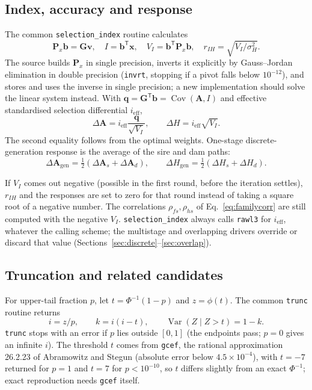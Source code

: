 \documentclass[11pt]{article}
\newcommand{\src}[1]{\texttt{#1}}
\newcommand{\Cov}{\operatorname{Cov}}
\newcommand{\Var}{\operatorname{Var}}
\newcommand{\ve}[1]{\boldsymbol{#1}}
\newcommand{\ma}[1]{\mathbf{#1}}
\begin{document}
\subsection{Index, accuracy and response}
The common \src{selection\_index} routine calculates
\begin{equation}\label{eq:index}
\ma P_x\ve b=\ma G\ve v,\quad
I=\ve b^{\mathsf T}\ve x,\quad V_I=\ve b^{\mathsf T}\ma P_x\ve b,\quad
r_{IH}=\sqrt{V_I/\sigma_H^2}.
\end{equation}
The source builds $\ma P_x$ in single precision, inverts it explicitly by Gauss--Jordan elimination in double precision (\src{invrt}, stopping if a pivot falls below $10^{-12}$), and stores and uses the inverse in single precision; a new implementation should solve the linear system instead. With $\ve q=\ma G^{\mathsf T}\ve b=\Cov(\ve A,I)$ and effective standardised selection differential $i_{\mathrm{eff}}$,
\begin{equation}\label{eq:response}
\Delta\ve A=i_{\mathrm{eff}}\frac{\ve q}{\sqrt{V_I}},\qquad
\Delta H=i_{\mathrm{eff}}\sqrt{V_I}.
\end{equation}
The second equality follows from the optimal weights. One-stage discrete-generation response is the average of the sire and dam paths:
\begin{equation}\label{eq:paths}
\Delta\ve A_{\mathrm{gen}}=\tfrac12(\Delta\ve A_s+\Delta\ve A_d),\qquad
\Delta H_{\mathrm{gen}}=\tfrac12(\Delta H_s+\Delta H_d).
\end{equation}

\begin{codenote}
If $V_I$ comes out negative (possible in the first round, before the iteration settles), $r_{IH}$ and the responses are set to zero for that round instead of taking a square root of a negative number. The correlations $\rho_{fs},\rho_{hs}$ of Eq.~\eqref{eq:familycorr} are still computed with the negative $V_I$. \src{selection\_index} always calls \src{rawl3} for $i_{\mathrm{eff}}$, whatever the calling scheme; the multistage and overlapping drivers override or discard that value (Sections~\ref{sec:discrete}--\ref{sec:overlap}).
\end{codenote}

\subsection{Truncation and related candidates}
For upper-tail fraction $p$, let $t=\Phi^{-1}(1-p)$ and $z=\phi(t)$. The common \src{trunc} routine returns
\begin{equation}\label{eq:trunc}
i=z/p,\qquad k=i(i-t),\qquad \Var(Z\mid Z>t)=1-k.
\end{equation}
\src{trunc} stops with an error if $p$ lies outside $[0,1]$ (the endpoints pass; $p=0$ gives an infinite $i$). The threshold $t$ comes from \src{gcef}, the rational approximation 26.2.23 of Abramowitz and Stegun (absolute error below $4.5\times10^{-4}$), with $t=-7$ returned for $p=1$ and $t=7$ for $p<10^{-10}$, so $t$ differs slightly from an exact $\Phi^{-1}$; exact reproduction needs \src{gcef} itself.
\end{document}

